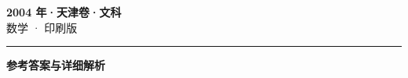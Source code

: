 \documentclass[zihao=5, a4paper]{ctexart}
\begin{document}
\begin{center}
  {\Large\bfseries 2004 年·天津卷·文科}\\[4pt]
  {\large 数学 · 印刷版}
\end{center}
\medskip
{}

\par\bigskip\hrule\bigskip
{}
\begin{center}{\large\bfseries 参考答案与详细解析}\end{center}
\smallskip

\end{document}
